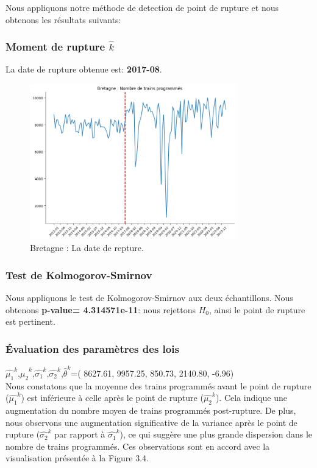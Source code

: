 {Nous appliquons notre méthode de detection de point de rupture et nous obtenons les résultats suivants:

\subsubsection{Moment de rupture $\hat{k}$}

La date de rupture obtenue est: \textbf{2017-08}. 

\begin{figure}[H]
\centering
\includegraphics[width=0.8\textwidth]{image/BR-FIG4.png} 
\caption{Bretagne : La date de repture.}
\label{fig:trains_programmes_2}
\end{figure}

\subsubsection{Test de Kolmogorov-Smirnov}

Nous appliquons le test de Kolmogorov-Smirnov aux deux échantillons. Nous obtenons \textbf{p-value= 4.314571e-11}: nous rejettons $H_0$, ainsi le point de rupture est pertinent.

\subsubsection{Évaluation des paramètres des lois}

$\hat{\mu_1}^k$,$\hat{\mu_2}^k$,$\hat{\sigma_1}^k$,$\hat{\sigma_2}^k$,$\hat{\theta}^k$=( 8627.61, 9957.25, 850.73, 2140.80, -6.96)\\
 
 

Nous constatons que la moyenne des trains programmés avant le point de rupture ($\hat{\mu_1}^k$) est inférieure à celle après le point de rupture ($\hat{\mu_2}^k$). Cela indique une augmentation du nombre moyen de trains programmés post-rupture. De plus, nous observons une augmentation significative de la variance après le point de rupture ($\hat{\sigma_2}^k$ par rapport à $\hat{\sigma_1}^k$), ce qui suggère une plus grande dispersion dans le nombre de trains programmés. Ces observations sont en accord avec la visualisation présentée à la Figure 3.4.\\ 


}
